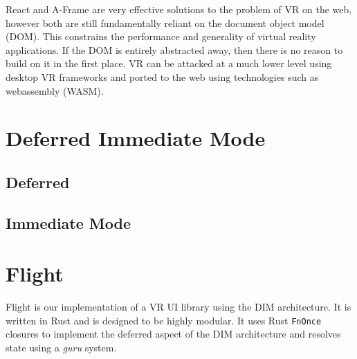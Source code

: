 \documentclass[conference,12pt]{IEEEtran}
\begin{document}
React and A-Frame are very effective solutions to the problem of VR on the web,
however both are still fundamentally reliant on the document object model (DOM).
This constrains the performance and generality of virtual reality applications.
If the DOM is entirely abstracted away, then there is no reason to build on it
in the first place. VR can be attacked at a much lower level using desktop VR
frameworks and ported to the web using technologies such as webassembly (WASM).





\section{Deferred Immediate Mode}\label{sec:dim}

\subsection{Deferred}

\subsection{Immediate Mode}

\section{Flight}\label{sec:flight}
Flight is our implementation of a VR UI library using the DIM architecture. It
is written in Rust and is designed to be highly modular. It uses Rust
\texttt{FnOnce} closures to implement the deferred aspect of the DIM
architecture and resolves state using a \textit{guru} system.
\end{document}
